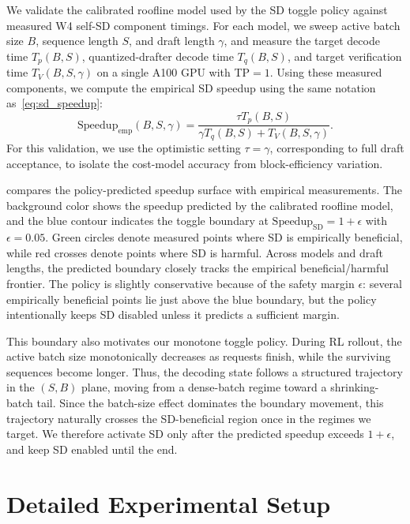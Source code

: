\documentclass{llmxive}
\providecommand{\DrafterDist}{q}
\providecommand{\TargetDist}{p}
\providecommand{\DraftLength}{\gamma}
\providecommand{\TargetTimebs}{T_\TargetDist(B,S)}
\providecommand{\DraftTimebs}{T_\DrafterDist(B,S)}
\providecommand{\VerifyTimebsg}{T_V(B,S,\DraftLength)}
\providecommand{\mal}{\tau}
\begin{document}
We validate the calibrated roofline model used by the SD toggle policy against measured W4 self-SD component timings.
For each model, we sweep active batch size $B$, sequence length $S$, and draft length $\DraftLength$, and measure the target decode time $\TargetTimebs$, quantized-drafter decode time $\DraftTimebs$, and target verification time $\VerifyTimebsg$ on a single A100 GPU with TP$=1$.
Using these measured components, we compute the empirical SD speedup using the same notation as~\cref{eq:sd_speedup}:
\begin{equation}
\mathrm{Speedup}_{\mathrm{emp}}(B,S,\gamma)
=
\frac{\mal \TargetTimebs}
{\DraftLength \DraftTimebs + \VerifyTimebsg}.
\label{eq:empirical_sd_speedup}
\end{equation}
For this validation, we use the optimistic setting $\mal=\DraftLength$, corresponding to full draft acceptance, to isolate the cost-model accuracy from block-efficiency variation.

 compares the policy-predicted speedup surface with empirical measurements.
The background color shows the speedup predicted by the calibrated roofline model, and the blue contour indicates the toggle boundary at $\mathrm{Speedup}_{\mathrm{SD}}=1+\epsilon$ with $\epsilon=0.05$.
Green circles denote measured points where SD is empirically beneficial, while red crosses denote points where SD is harmful.
Across models and draft lengths, the predicted boundary closely tracks the empirical beneficial/harmful frontier.
The policy is slightly conservative because of the safety margin $\epsilon$: several empirically beneficial points lie just above the blue boundary, but the policy intentionally keeps SD disabled unless it predicts a sufficient margin.

This boundary also motivates our monotone toggle policy.
During RL rollout, the active batch size monotonically decreases as requests finish, while the surviving sequences become longer.
Thus, the decoding state follows a structured trajectory in the $(S,B)$ plane, moving from a dense-batch regime toward a shrinking-batch tail.
Since the batch-size effect dominates the boundary movement, this trajectory naturally crosses the SD-beneficial region once in the regimes we target.
We therefore activate SD only after the predicted speedup exceeds $1+\epsilon$, and keep SD enabled until the end.

\section{Detailed Experimental Setup}
\label{app:experimental_setup}
\end{document}
